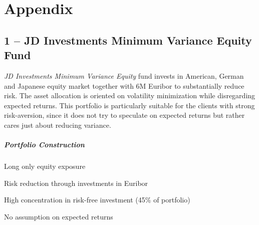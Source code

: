 \documentclass[11pt, DIV=15]{scrreprt}
\begin{document}
\newpage
\chapter{Appendix}
\section*{1 -- JD Investments Minimum Variance Equity Fund}
\textit{JD Investments Minimum Variance Equity} fund invests in American, German and Japanese equity market together with 6M Euribor to substantially reduce risk.
The asset allocation is oriented on volatility minimization while disregarding expected returns.
This portfolio is particularly suitable for the clients with strong risk-aversion, since it does not try to speculate on expected returns but rather cares just about reducing variance.

\paragraph{Portfolio Construction}
\begin{sit}
\item Long only equity exposure
\item Risk reduction through investments in Euribor
\item High concentration in risk-free investment (45\% of portfolio)
\item No assumption on expected returns
\end{sit}

\begin{figure}[H]
\end{figure}
\end{document}
